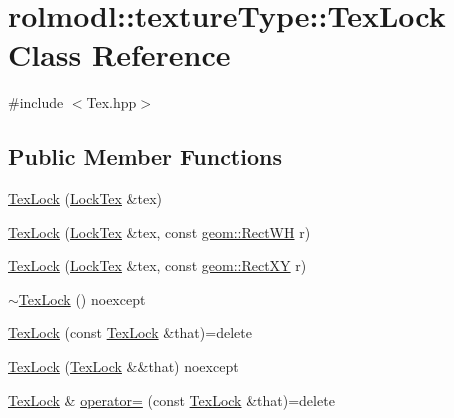 \hypertarget{classrolmodl_1_1texture_type_1_1_tex_lock}{}\section{rolmodl\+::texture\+Type\+::Tex\+Lock Class Reference}
\label{classrolmodl_1_1texture_type_1_1_tex_lock}


{\ttfamily \#include $<$Tex.\+hpp$>$}

\subsection*{Public Member Functions}
\begin{DoxyCompactItemize}
\item 
\mbox{\hyperlink{classrolmodl_1_1texture_type_1_1_tex_lock_a45895d73fd7794d5012c87824b97068b}{Tex\+Lock}} (\mbox{\hyperlink{classrolmodl_1_1texture_type_1_1_lock_tex}{Lock\+Tex}} \&tex)
\item 
\mbox{\hyperlink{classrolmodl_1_1texture_type_1_1_tex_lock_a21143b6a4a098af740429b2bd99ef4f2}{Tex\+Lock}} (\mbox{\hyperlink{classrolmodl_1_1texture_type_1_1_lock_tex}{Lock\+Tex}} \&tex, const \mbox{\hyperlink{structrolmodl_1_1geom_1_1_rect_w_h}{geom\+::\+Rect\+WH}} r)
\item 
\mbox{\hyperlink{classrolmodl_1_1texture_type_1_1_tex_lock_ad65b80da190870f996a1d7a6d72e9b9b}{Tex\+Lock}} (\mbox{\hyperlink{classrolmodl_1_1texture_type_1_1_lock_tex}{Lock\+Tex}} \&tex, const \mbox{\hyperlink{structrolmodl_1_1geom_1_1_rect_x_y}{geom\+::\+Rect\+XY}} r)
\item 
\mbox{\hyperlink{classrolmodl_1_1texture_type_1_1_tex_lock_ab953ac65a0503b42b161ed30eadb30d2}{$\sim$\+Tex\+Lock}} () noexcept
\item 
\mbox{\hyperlink{classrolmodl_1_1texture_type_1_1_tex_lock_a71e01ea67ff11cc3e6d75716fda90833}{Tex\+Lock}} (const \mbox{\hyperlink{classrolmodl_1_1texture_type_1_1_tex_lock}{Tex\+Lock}} \&that)=delete
\item 
\mbox{\hyperlink{classrolmodl_1_1texture_type_1_1_tex_lock_ab9fdbdef0222e9da9192f095d79cfc3f}{Tex\+Lock}} (\mbox{\hyperlink{classrolmodl_1_1texture_type_1_1_tex_lock}{Tex\+Lock}} \&\&that) noexcept
\item 
\mbox{\hyperlink{classrolmodl_1_1texture_type_1_1_tex_lock}{Tex\+Lock}} \& \mbox{\hyperlink{classrolmodl_1_1texture_type_1_1_tex_lock_a2660d989db4bb18776fac958939417f2}{operator=}} (const \mbox{\hyperlink{classrolmodl_1_1texture_type_1_1_tex_lock}{Tex\+Lock}} \&that)=delete

\end{DoxyCompactItemize}
